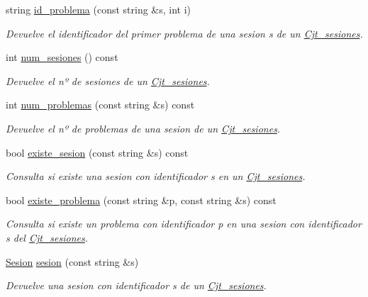 \begin{DoxyCompactItemize}
string \mbox{\hyperlink{class_cjt__sesiones_a5dbd8b1687f2713d2b29af8781f1d013}{id\+\_\+problema}} (const string \&s, int i)
\begin{DoxyCompactList}\small\item\em Devuelve el identificador del primer problema de una sesion s de un \mbox{\hyperlink{class_cjt__sesiones}{Cjt\+\_\+sesiones}}. \end{DoxyCompactList}\item 
int \mbox{\hyperlink{class_cjt__sesiones_afd0955b255bea0e7e8f9a7be5156e5fc}{num\+\_\+sesiones}} () const
\begin{DoxyCompactList}\small\item\em Devuelve el nº de sesiones de un \mbox{\hyperlink{class_cjt__sesiones}{Cjt\+\_\+sesiones}}. \end{DoxyCompactList}\item 
int \mbox{\hyperlink{class_cjt__sesiones_a25fab9688073ad869f8e8f53445955d6}{num\+\_\+problemas}} (const string \&s) const
\begin{DoxyCompactList}\small\item\em Devuelve el nº de problemas de una sesion de un \mbox{\hyperlink{class_cjt__sesiones}{Cjt\+\_\+sesiones}}. \end{DoxyCompactList}\item 
bool \mbox{\hyperlink{class_cjt__sesiones_a61e4dc88659968aa94cb39f99af99a6b}{existe\+\_\+sesion}} (const string \&s) const
\begin{DoxyCompactList}\small\item\em Consulta si existe una sesion con identificador s en un \mbox{\hyperlink{class_cjt__sesiones}{Cjt\+\_\+sesiones}}. \end{DoxyCompactList}\item 
bool \mbox{\hyperlink{class_cjt__sesiones_a4d62c47239f444a5612e37738bdab300}{existe\+\_\+problema}} (const string \&p, const string \&s) const
\begin{DoxyCompactList}\small\item\em Consulta si existe un problema con identificador p en una sesion con identificador s del \mbox{\hyperlink{class_cjt__sesiones}{Cjt\+\_\+sesiones}}. \end{DoxyCompactList}\item 
\mbox{\hyperlink{class_sesion}{Sesion}} \mbox{\hyperlink{class_cjt__sesiones_a9e0c9082d6baad2a6ab002fcbfefc8ea}{sesion}} (const string \&s)
\begin{DoxyCompactList}\small\item\em Devuelve una sesion con identificador s de un \mbox{\hyperlink{class_cjt__sesiones}{Cjt\+\_\+sesiones}}. \end{DoxyCompactList}\item 

\end{DoxyCompactItemize}

